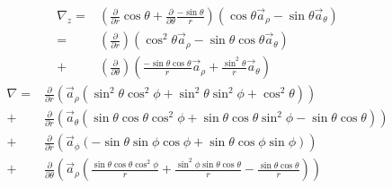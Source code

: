                \begin{align*}
                    \nabla_z = & \left(\frac{\partial}{\partial r}\cos\theta + \frac{\partial}{\partial\theta}\frac{-\sin\theta}{r}\right)
                               \left(\cos\theta\vec{a}_\rho - \sin\theta\vec{a}_\theta\right) \\
                             = & \left(\frac{\partial}{\partial r}\right)\left(\cos^2\theta\vec{a}_\rho - \sin\theta\cos\theta\vec{a}_\theta\right)\\
                             + & \left(\frac{\partial}{\partial \theta}\right)\left(\frac{-\sin\theta\cos\theta}{r}\vec{a}_\rho + \frac{\sin^2\theta}{r}\vec{a}_\theta\right)
                \end{align*}
                \begin{align*}
                    \nabla = & \frac{\partial}{\partial r}\left(
                                    \vec{a}_\rho\left(
                                        \sin^2\theta\cos^2\phi + 
                                        \sin^2\theta\sin^2\phi +
                                        \cos^2\theta     
                                    \right)
                                \right) \\
                           + & \frac{\partial}{\partial r}\left(
                                    \vec{a}_\theta\left(
                                        \sin\theta\cos\theta\cos^2\phi + 
                                        \sin\theta\cos\theta\sin^2\phi - 
                                        \sin\theta\cos\theta     
                                    \right)
                                \right) \\
                           + & \frac{\partial}{\partial r}\left(
                                    \vec{a}_\phi\left(
                                        -\sin\theta\sin\phi\cos\phi
                                        +\sin\theta\cos\phi\sin\phi     
                                    \right)
                                \right) \\
                           + & \frac{\partial}{\partial\theta}\left(
                                    \vec{a}_\rho\left(
                                        \frac{\sin\theta\cos\theta\cos^2\phi}{r} + 
                                        \frac{\sin^2\phi\sin\theta\cos\theta}{r} -
                                        \frac{\sin\theta\cos\theta}{r}
                                    \right) 
                                \right) \\

\end{align*}
